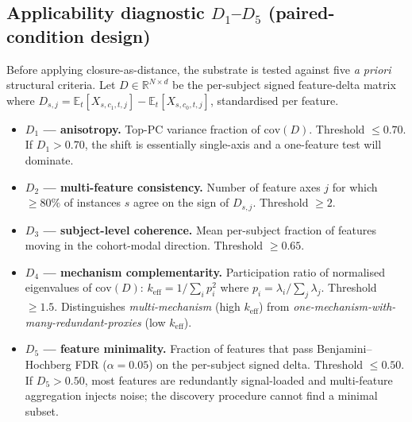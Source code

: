 \documentclass[11pt,a4paper]{article}
\begin{document}
\subsection{Applicability diagnostic $D_1$--$D_5$ (paired-condition design)}\label{sec:method-diagnostic}

Before applying closure-as-distance, the substrate is tested against five \emph{a priori} structural criteria. Let $D \in \mathbb{R}^{N \times d}$ be the per-subject signed feature-delta matrix where $D_{s,j} = \mathbb{E}_t[X_{s,c_1,t,j}] - \mathbb{E}_t[X_{s,c_0,t,j}]$, standardised per feature.

\begin{itemize}\itemsep0pt
\item \textbf{$D_1$ --- anisotropy.} Top-PC variance fraction of $\mathrm{cov}(D)$. Threshold $\leq 0.70$. If $D_1 > 0.70$, the shift is essentially single-axis and a one-feature test will dominate.
\item \textbf{$D_2$ --- multi-feature consistency.} Number of feature axes $j$ for which $\geq 80\%$ of instances $s$ agree on the sign of $D_{s,j}$. Threshold $\geq 2$.
\item \textbf{$D_3$ --- subject-level coherence.} Mean per-subject fraction of features moving in the cohort-modal direction. Threshold $\geq 0.65$.
\item \textbf{$D_4$ --- mechanism complementarity.} Participation ratio of normalised eigenvalues of $\mathrm{cov}(D)$: $k_{\mathrm{eff}} = 1 / \sum_i p_i^2$ where $p_i = \lambda_i / \sum_j \lambda_j$. Threshold $\geq 1.5$. Distinguishes \emph{multi-mechanism} (high $k_{\mathrm{eff}}$) from \emph{one-mechanism-with-many-redundant-proxies} (low $k_{\mathrm{eff}}$).
\item \textbf{$D_5$ --- feature minimality.} Fraction of features that pass Benjamini--Hochberg FDR ($\alpha = 0.05$) on the per-subject signed delta. Threshold $\leq 0.50$. If $D_5 > 0.50$, most features are redundantly signal-loaded and multi-feature aggregation injects noise; the discovery procedure cannot find a minimal subset.
\end{itemize}
\end{document}
